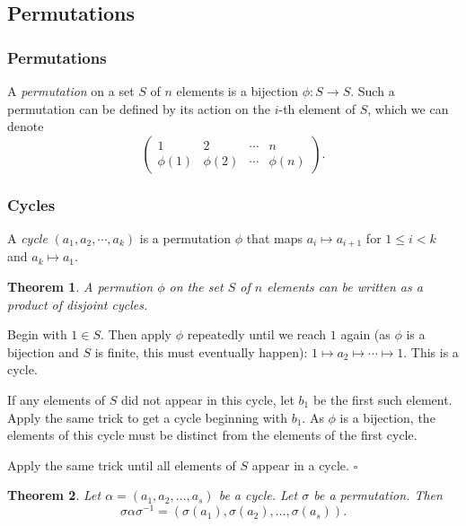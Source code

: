 \documentclass[10pt]{article}
\newtheorem{theorem}{Theorem}[section]
\newenvironment{proof}[1][Proof]{\begin{trivlist}
\item[\hskip \labelsep {\itshape #1}]}{\end{trivlist}}
\newenvironment{definition}[1][Definition]{\begin{trivlist}
\item[\hskip \labelsep {\bfseries #1}]}{\end{trivlist}}
\begin{document}
\subsection{Permutations}

\subsubsection{Permutations}

\begin{definition}
A \emph{permutation} on a set $S$ of $n$ elements is a bijection $\phi : S \to S$. Such a permutation can be defined by its action on the $i$-th element of $S$, which we can denote
$$\left(\begin{array}{cccc}1 & 2 & \cdots & n\\ \phi(1) & \phi(2) & \cdots & \phi(n)\end{array}\right).$$
\end{definition}

\subsubsection{Cycles}

\begin{definition}
A \emph{cycle} $(a_1, a_2, \cdots, a_k)$ is a permutation $\phi$ that maps $a_i \mapsto a_{i+1}$ for $1 \leq i < k$ and $a_k \mapsto a_1$.
\end{definition}

\begin{theorem}
A permution $\phi$ on the set $S$ of $n$ elements can be written as a product of disjoint cycles.
\end{theorem}

\begin{proof}
Begin with $1 \in S$. Then apply $\phi$ repeatedly until we reach $1$ again (as $\phi$ is a bijection and $S$ is finite, this must eventually happen): $1 \mapsto a_2 \mapsto \cdots \mapsto 1$. This is a cycle.

If any elements of $S$ did not appear in this cycle, let $b_1$ be the first such element. Apply the same trick to get a cycle beginning with $b_1$. As $\phi$ is a bijection, the elements of this cycle must be distinct from the elements of the first cycle.

Apply the same trick until all elements of $S$ appear in a cycle. $\square$
\end{proof}

\begin{theorem}
Let $\alpha = (a_1, a_2, \ldots, a_s)$ be a cycle. Let $\sigma$ be a permutation. Then
$$\sigma\alpha\sigma^{-1} = (\sigma(a_1), \sigma(a_2), \ldots, \sigma(a_s)).$$
\end{theorem}
\end{document}
